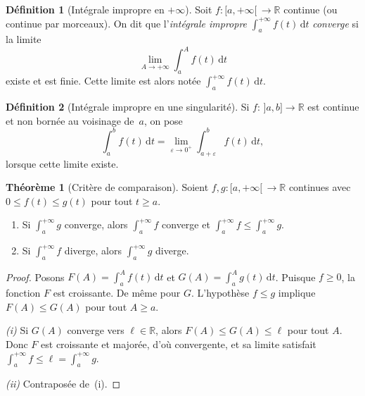 \documentclass[12pt,a4paper,openany]{book}
\theoremstyle{definition}
\newtheorem{definition}{Définition}[chapter]
\newtheorem{theoreme}{Théorème}[chapter]
\newcommand{\R}{\mathbb{R}}
\newcommand{\eps}{\varepsilon}
\newcommand{\dd}{\mathrm{d}}
\begin{document}
\begin{definition}[Intégrale impropre en $+\infty$]\label{def:integrale-impropre-infty}
  Soit $f \colon [a, +\infty[\, \to \R$ continue (ou continue par morceaux). On dit que l'\emph{intégrale impropre} $\displaystyle\int_a^{+\infty} f(t)\,\dd t$ \emph{converge} si la limite
  \[
    \lim_{A \to +\infty} \int_a^A f(t)\,\dd t
  \]
  existe et est finie. Cette limite est alors notée $\displaystyle\int_a^{+\infty} f(t)\,\dd t$.
\end{definition}

\begin{definition}[Intégrale impropre en une singularité]\label{def:integrale-impropre-sing}
  Si $f \colon \,]a, b] \to \R$ est continue et non bornée au voisinage de~$a$, on pose
  \[
    \int_a^b f(t)\,\dd t = \lim_{\eps \to 0^+} \int_{a+\eps}^b f(t)\,\dd t,
  \]
  lorsque cette limite existe.
\end{definition}

\begin{theoreme}[Critère de comparaison]\label{thm:comparaison-impropre}
  Soient $f, g \colon [a, +\infty[\, \to \R$ continues avec $0 \leqslant f(t) \leqslant g(t)$ pour tout $t \geqslant a$.
  \begin{enumerate}[label=(\roman*)]
    \item Si $\displaystyle\int_a^{+\infty} g$ converge, alors $\displaystyle\int_a^{+\infty} f$ converge et $\displaystyle\int_a^{+\infty} f \leqslant \int_a^{+\infty} g$.
    \item Si $\displaystyle\int_a^{+\infty} f$ diverge, alors $\displaystyle\int_a^{+\infty} g$ diverge.
  \end{enumerate}
\end{theoreme}

\begin{proof}
  Posons $F(A) = \int_a^A f(t)\,\dd t$ et $G(A) = \int_a^A g(t)\,\dd t$. Puisque $f \geqslant 0$, la fonction $F$ est croissante. De même pour $G$. L'hypothèse $f \leqslant g$ implique $F(A) \leqslant G(A)$ pour tout $A \geqslant a$.

  \emph{(i)} Si $G(A)$ converge vers $\ell \in \R$, alors $F(A) \leqslant G(A) \leqslant \ell$ pour tout $A$. Donc $F$ est croissante et majorée, d'où convergente, et sa limite satisfait $\int_a^{+\infty} f \leqslant \ell = \int_a^{+\infty} g$.

  \emph{(ii)} Contraposée de~(i).
\end{proof}
\end{document}
